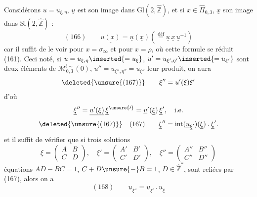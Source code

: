 
Considérons $u=u_{\xi,\eta}$,
$\underline u$ est son image dans $\mathrm{Gl}(2,\widehat{\mathbb Z})$,
et si $x\in\widehat\Pi_{0,3}$, $\underline x$
son image dans $\mathrm{Sl}(2,\widehat{\mathbb Z})$ :
\[
(166)\qquad
\underline{u(x)}=\underline u(\underline x)
\left(\stackrel{\text{déf}}{=}
\underline u\,\underline x\,\underline u^{-1}\right)
\]
car il suffit de le voir pour $x=\sigma_\infty$ et pour $x=\rho$,
où cette formule se réduit  (161). Ceci noté,
si $u=u_{\xi,\eta}\inserted{=u_\xi}$,
$u'=u_{\xi',\eta'}\inserted{=u_{\xi'}}$
sont deux éléments de $\mathcal M_{0,3}^{!\sim}(0)$,
$u''=u_{\xi'',\eta''}=u_{\xi''}$ leur produit, on aura
\[
\deleted{\unsure{(167)}}\qquad\xi''=u'(\xi)\xi'
\]
d'où
\[
\underline\xi''=\underline{u'(\xi)}\,\underline\xi^{\unsure{\prime}}
=\underline u'(\underline\xi)\,\underline\xi',\quad\text{i.e.}
\]
\[
\deleted{\unsure{(167)}}\quad(167)\qquad
\underline\xi''=\operatorname{int}
(\underline u_{\underline\xi'})(\underline\xi)\mathbin{.}\underline\xi'.
\]
et il suffit de vérifier que si trois solutions
\[
\xi=\begin{pmatrix}A&B\\C&D\end{pmatrix},
\quad\xi'=\begin{pmatrix}A'&B'\\C'&D'\end{pmatrix},
\quad\xi''=\begin{pmatrix}A''&B''\\C''&D''\end{pmatrix}
\]
 équations
$AD-BC=1$, $C+D\unsure{-}B=1$, $D\in\widehat{\mathbb Z}^{*}$,
sont reliées par (167), alors on a
\[
(168)\qquad
\underline u_{\xi''}=\underline u_{\xi'}\mathbin{.}\underline u_\xi
\]


